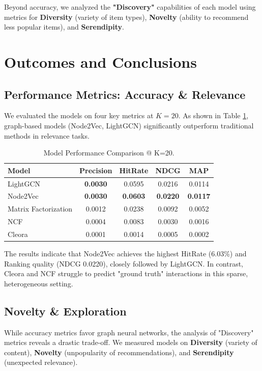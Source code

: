 \documentclass{article}
\begin{document}
Beyond accuracy, we analyzed the \textbf{"Discovery"} capabilities of each model using metrics for \textbf{Diversity} (variety of item types), \textbf{Novelty} (ability to recommend less popular items), and \textbf{Serendipity}.


\section{Outcomes and Conclusions}

\subsection{Performance Metrics: Accuracy \& Relevance}
We evaluated the models on four key metrics at $K=20$. As shown in Table \ref{tab:accuracy}, graph-based models (Node2Vec, LightGCN) significantly outperform traditional methods in relevance tasks.

\begin{table}[H]
    \centering
    \caption{Model Performance Comparison @ K=20.}
    \label{tab:accuracy}
    \begin{tabular}{lcccc}
        \toprule
        \textbf{Model} & \textbf{Precision} & \textbf{HitRate} & \textbf{NDCG} & \textbf{MAP} \\
        \midrule
        LightGCN & \textbf{0.0030} & 0.0595 & 0.0216 & 0.0114 \\
        Node2Vec & \textbf{0.0030} & \textbf{0.0603} & \textbf{0.0220} & \textbf{0.0117} \\
        Matrix Factorization & 0.0012 & 0.0238 & 0.0092 & 0.0052 \\
        NCF & 0.0004 & 0.0083 & 0.0030 & 0.0016 \\
        Cleora & 0.0001 & 0.0014 & 0.0005 & 0.0002 \\
        \bottomrule
    \end{tabular}
\end{table}

The results indicate that Node2Vec achieves the highest HitRate (6.03\%) and Ranking quality (NDCG 0.0220), closely followed by LightGCN. In contrast, Cleora and NCF struggle to predict "ground truth" interactions in this sparse, heterogeneous setting.

\subsection{Novelty \& Exploration}
While accuracy metrics favor graph neural networks, the analysis of "Discovery" metrics reveals a drastic trade-off. We measured models on \textbf{Diversity} (variety of content), \textbf{Novelty} (unpopularity of recommendations), and \textbf{Serendipity} (unexpected relevance).
\end{document}
